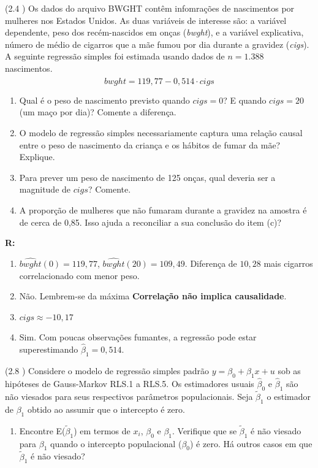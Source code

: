 \documentclass[12pt,letterpaper, onecolumn]{exam}
\renewenvironment{solution}
  {\par\noindent\textbf{R:}\enspace\color{blue}}
  {\par\color{black}}
\begin{document}
\begin{questions}

    \question (2.4 \citep{wooldridge2016}) Os dados do arquivo BWGHT contêm infomrações de nascimentos por mulheres nos Estados Unidos. As duas variáveis de interesse são: a variável dependente, peso dos recém-nascidos em onças (\textit{bwght}), e a variável explicativa, número de médio de cigarros que a mãe fumou por dia durante a gravidez (\textit{cigs}). A seguinte regressão simples foi estimada usando dados de $n = 1.388$ nascimentos.\begin{equation*}
        \widehat{bwght} = 119,77 - 0,514 \cdot cigs
    \end{equation*}
    \begin{enumerate}[label=(\alph*)]
    \item Qual é o peso de nascimento previsto quando $cigs = 0$? E quando $cigs = 20$ (um maço por dia)? Comente a diferença.
    \item O modelo de regressão simples necessariamente captura uma relação causal entre o peso de nascimento da criança e os hábitos de fumar da mãe? Explique.
    \item Para prever um peso de nascimento de 125 onças, qual deveria ser a magnitude de $cigs$? Comente.
    \item A proporção de mulheres que não fumaram durante a gravidez na amostra é de cerca de 0,85. Isso ajuda a reconciliar a sua conclusão do item (c)?
    \end{enumerate}

\begin{solution}
        \begin{enumerate}[label=(\alph*)]
    \item $\widehat{bwght}(0)=119{,}77$, \quad $\widehat{bwght}(20)=109{,}49$. Diferença de $10{,}28$ mais cigarros correlacionado com menor peso.
    \item Não. Lembrem-se da máxima \textbf{Correlação não implica causalidade}.
    \item  $cigs \approx -10{,}17$
    \item Sim. Com poucas observações fumantes, a regressão pode estar superestimando $\hat\beta_1 = 0,514$.
    \end{enumerate}
\end{solution}
    
    \question (2.8 \citep{wooldridge2016}) Considere o modelo de regressão simples padrão $y = \beta_0 + \beta_1x + u$ sob as hipóteses de Gauss-Markov RLS.1 a RLS.5. Os estimadores usuais $\hat{\beta}_0$ e $\hat{\beta}_1$ são não viesados para seus respectivos parâmetros populacionais. Seja $\tilde{\beta}_1$ o estimador de $\beta_1$ obtido ao assumir que o intercepto é zero.
    \begin{enumerate}[label=(\alph*)]
    \item Encontre E($\tilde{\beta}_1$) em termos de $x_i$, $\beta_0$ e $\beta_1$. Verifique que se $\tilde \beta_1$ é não viesado para $\beta_1$ quando o intercepto populacional ($\beta_0$) é zero. Há outros casos em que $\tilde \beta_1$ é não viesado?


\end{enumerate}
\end{questions}
\end{document}
